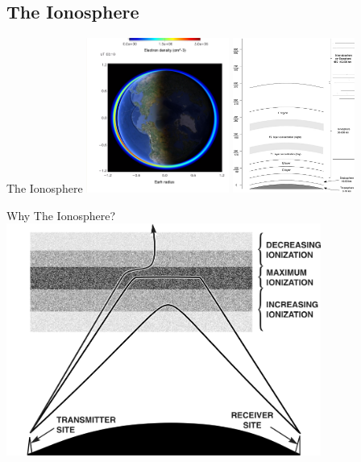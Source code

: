 \documentclass{beamer}
\begin{document}
\subsection{The Ionosphere}
\begin{frame}{The Ionosphere}
 \includegraphics[height=2.0in]{planet}
 \includegraphics[height=2.0in]{layers}
\end{frame}

\begin{frame}{Why The Ionosphere?}
 \includegraphics[height=3.0in]{bounce}
\end{frame}

\end{document}
